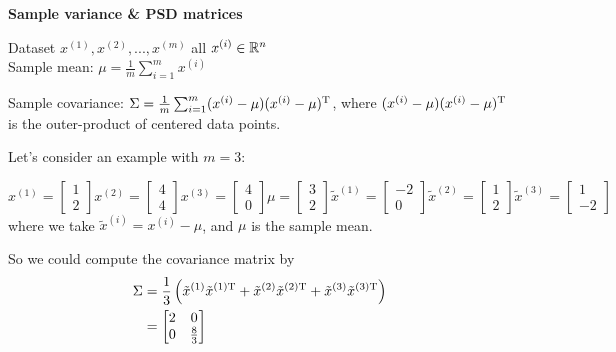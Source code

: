 \textbf{Sample variance \& PSD matrices}

Dataset $x^{(1)}, x^{(2)}, ..., x^{(m)}$ all $x^{(i)}\in \mathbb{R}^n$\\

Sample mean: $\mu = \frac{1}{m}\sum^m_{i=1}x^{(i)}$

Sample covariance: $\Sigma = \frac{1}{m}\sum^m_{i=1}(x^{(i)}-\mu)(x^{(i)}-\mu)^{{\rm T}}$, where $(x^{(i)}-\mu)(x^{(i)}-\mu)^{{\rm T}}$ is the outer-product of centered data points.

\vspace{0.3cm}
Let's consider an example with $m=3$:

$$x^{(1)} =
\left[
\begin{matrix}
1\\
2
\end{matrix}
\right]x^{(2)} =
\left[
\begin{matrix}
4\\
4
\end{matrix}
\right]x^{(3)} =
\left[
\begin{matrix}
4\\
0
\end{matrix}
\right]\mu =
\left[
\begin{matrix}
3\\
2
\end{matrix}
\right]\tilde{x}^{(1)} =
\left[
\begin{matrix}
-2\\
0
\end{matrix}
\right]\tilde{x}^{(2)} =
\left[
\begin{matrix}
1\\
2
\end{matrix}
\right]\tilde{x}^{(3)} =
\left[
\begin{matrix}
1\\
-2
\end{matrix}
\right]
$$
where we take $\tilde{x}^{(i)}=x^{(i)}-\mu$, and $\mu$ is the sample mean.

So we could compute the covariance matrix by
\begin{align*}
\Sigma &= \frac{1}{3} \left(\tilde{x}^{(1)}\tilde{x}^{(1){\rm T}}+\tilde{x}^{(2)}\tilde{x}^{(2){\rm T}}    +\tilde{x}^{(3)}\tilde{x}^{(3){\rm T}}\right)\\
&= \left[
\begin{matrix}
2&0\\
0&\frac{8}{3}
\end{matrix}
\right]
\end{align*}

